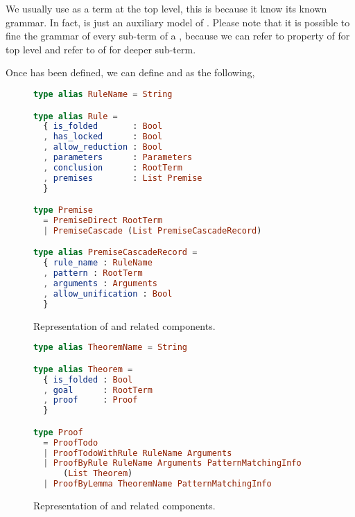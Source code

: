 \documentclass[master.tex]{subfiles}
\begin{document}
We usually use  as a term at the top level, this is because it
know its known grammar. In fact,  is just an auxiliary model of
. Please note that it is possible to fine the grammar of every
sub-term of a , because we can refer to 
property of  for top level and refer to 
of  for deeper sub-term.

Once  has been defined, we can define  and
 as the following,

\begin{figure}[H]
\begin{framed}
\begin{lstlisting}[language=elm]
type alias RuleName = String

type alias Rule =
  { is_folded       : Bool
  , has_locked      : Bool
  , allow_reduction : Bool
  , parameters      : Parameters
  , conclusion      : RootTerm
  , premises        : List Premise
  }

type Premise
  = PremiseDirect RootTerm
  | PremiseCascade (List PremiseCascadeRecord)

type alias PremiseCascadeRecord =
  { rule_name : RuleName
  , pattern : RootTerm
  , arguments : Arguments
  , allow_unification : Bool
  }
\end{lstlisting}

\end{framed}
\caption{Representation of  and related components.}
\label{fig:implementation-repo-rule}
\end{figure}


\begin{figure}[H]
\begin{framed}
\begin{lstlisting}[language=elm]
type alias TheoremName = String

type alias Theorem =
  { is_folded : Bool
  , goal      : RootTerm
  , proof     : Proof
  }

type Proof
  = ProofTodo
  | ProofTodoWithRule RuleName Arguments
  | ProofByRule RuleName Arguments PatternMatchingInfo
      (List Theorem)
  | ProofByLemma TheoremName PatternMatchingInfo
\end{lstlisting}
\end{framed}
\caption{Representation of  and related components.}
\label{fig:implementation-repo-theorem}
\end{figure}
\end{document}
